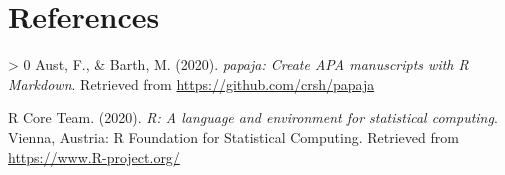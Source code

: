 \documentclass[
  english,
  man]{apa6}
\newlength{\cslhangindent}
\newenvironment{CSLReferences}[3] %
 {%
  \setlength{\parindent}{0pt}
  \ifodd #1 \everypar{\setlength{\hangindent}{\cslhangindent}}\ignorespaces\fi
  \ifnum #2 > 0
  \setlength{\parskip}{#2\baselineskip}
  \fi
 }%
 {}
\begin{document}
\newpage

\hypertarget{references}{%
\section{References}\label{references}}

\begingroup
\setlength{\parindent}{-0.5in}
\setlength{\leftskip}{0.5in}

\hypertarget{refs}{}
\begin{CSLReferences}{1}{0}
\leavevmode\hypertarget{ref-R-papaja}{}%
Aust, F., \& Barth, M. (2020). \emph{{papaja}: {Create} {APA} manuscripts with {R Markdown}}. Retrieved from \url{https://github.com/crsh/papaja}

\leavevmode\hypertarget{ref-R-base}{}%
R Core Team. (2020). \emph{R: A language and environment for statistical computing}. Vienna, Austria: R Foundation for Statistical Computing. Retrieved from \url{https://www.R-project.org/}

\end{CSLReferences}

\endgroup
\end{document}
